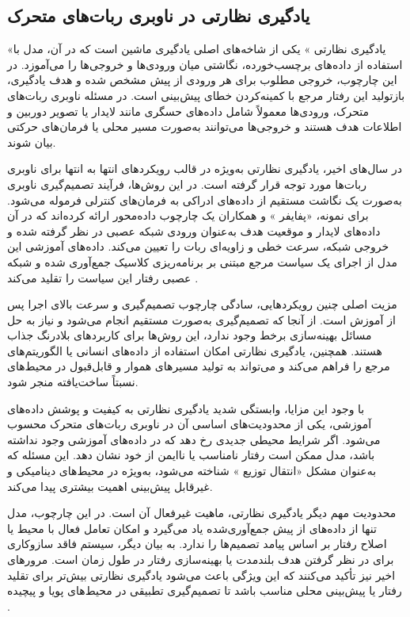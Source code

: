 \subsection{یادگیری نظارتی در ناوبری ربات‌های متحرک}

«یادگیری نظارتی%
»
یکی از شاخه‌های اصلی یادگیری ماشین است که در آن، مدل با استفاده از داده‌های برچسب‌خورده، نگاشتی میان ورودی‌ها و خروجی‌ها را می‌آموزد. در این چارچوب، خروجی مطلوب برای هر ورودی از پیش مشخص شده و هدف یادگیری، بازتولید این رفتار مرجع با کمینه‌کردن خطای پیش‌بینی است. در مسئله ناوبری ربات‌های متحرک، ورودی‌ها معمولاً شامل داده‌های حسگری مانند لایدار یا تصویر دوربین و اطلاعات هدف هستند و خروجی‌ها می‌توانند به‌صورت مسیر محلی یا فرمان‌های حرکتی بیان شوند.

در سال‌های اخیر، یادگیری نظارتی به‌ویژه در قالب رویکردهای انتها به انتها برای ناوبری ربات‌ها مورد توجه قرار گرفته است. در این روش‌ها، فرآیند تصمیم‌گیری ناوبری به‌صورت یک نگاشت مستقیم از داده‌های ادراکی به فرمان‌های کنترلی فرموله می‌شود. برای نمونه، «پفایفر%
»%
 و همکاران یک چارچوب داده‌محور ارائه کرده‌اند که در آن داده‌های لایدار و موقعیت هدف به‌عنوان ورودی شبکه عصبی در نظر گرفته شده و خروجی شبکه، سرعت خطی و زاویه‌ای ربات را تعیین می‌کند. داده‌های آموزشی این مدل از اجرای یک سیاست مرجع مبتنی بر برنامه‌ریزی کلاسیک جمع‌آوری شده و شبکه عصبی رفتار این سیاست را تقلید می‌کند%
\cite{pfeiffer2018nav}.

مزیت اصلی چنین رویکردهایی، سادگی چارچوب تصمیم‌گیری و سرعت بالای اجرا پس از آموزش است. از آنجا که تصمیم‌گیری به‌صورت مستقیم انجام می‌شود و نیاز به حل مسائل بهینه‌سازی برخط وجود ندارد، این روش‌ها برای کاربردهای بلادرنگ جذاب هستند. همچنین، یادگیری نظارتی امکان استفاده از داده‌های انسانی یا الگوریتم‌های مرجع را فراهم می‌کند و می‌تواند به تولید مسیرهای هموار و قابل‌قبول در محیط‌های نسبتاً ساخت‌یافته منجر شود.

با وجود این مزایا، وابستگی شدید یادگیری نظارتی به کیفیت و پوشش داده‌های آموزشی، یکی از محدودیت‌های اساسی آن در ناوبری ربات‌های متحرک محسوب می‌شود. اگر شرایط محیطی جدیدی رخ دهد که در داده‌های آموزشی وجود نداشته باشد، مدل ممکن است رفتار نامناسب یا ناایمن از خود نشان دهد. این مسئله که به‌عنوان مشکل «انتقال توزیع%
»%
 شناخته می‌شود، به‌ویژه در محیط‌های دینامیکی و غیرقابل پیش‌بینی اهمیت بیشتری پیدا می‌کند.

محدودیت مهم دیگر یادگیری نظارتی، ماهیت غیرفعال آن است. در این چارچوب، مدل تنها از داده‌های از پیش جمع‌آوری‌شده یاد می‌گیرد و امکان تعامل فعال با محیط یا اصلاح رفتار بر اساس پیامد تصمیم‌ها را ندارد. به بیان دیگر، سیستم فاقد سازوکاری برای در نظر گرفتن هدف بلندمدت یا بهینه‌سازی رفتار در طول زمان است. مرورهای اخیر نیز تأکید می‌کنند که این ویژگی باعث می‌شود یادگیری نظارتی بیش‌تر برای تقلید رفتار یا پیش‌بینی محلی مناسب باشد تا تصمیم‌گیری تطبیقی در محیط‌های پویا و پیچیده%
\cite{alvarez2024DRLsurvey}.

